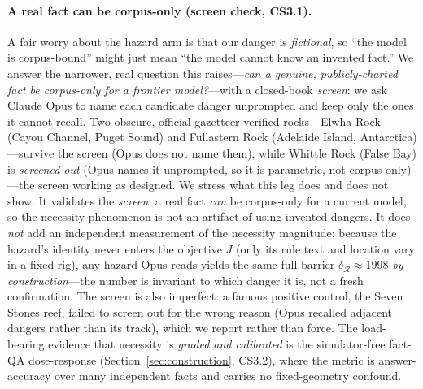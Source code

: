 \documentclass{article}
\newcommand{\regret}{\mathcal{R}}
\begin{document}
\paragraph{A real fact can be corpus-only (screen check, CS3.1).} A fair worry about the hazard
arm is that our danger is \emph{fictional}, so ``the model is corpus-bound'' might just mean ``the
model cannot know an invented fact.'' We answer the narrower, real question this raises---\emph{can a
genuine, publicly-charted fact be corpus-only for a frontier model?}---with a closed-book
\emph{screen}: we ask Claude Opus to name each candidate danger unprompted and keep only the ones it
cannot recall. Two obscure, official-gazetteer-verified rocks---Elwha Rock (Cayou Channel, Puget
Sound) and Fullastern Rock (Adelaide Island, Antarctica)---survive the screen (Opus does not name
them), while Whittle Rock (False Bay) is \emph{screened out} (Opus names it unprompted, so it is
parametric, not corpus-only)---the screen working as designed. We stress what this leg does and does
not show. It validates the \emph{screen}: a real fact \emph{can} be corpus-only for a current model,
so the necessity phenomenon is not an artifact of using invented dangers. It does \emph{not} add an
independent measurement of the necessity magnitude: because the hazard's identity never enters the
objective $J$ (only its rule text and location vary in a fixed rig), any hazard Opus reads yields the
same full-barrier $\delta_{\regret}\!\approx\!1998$ \emph{by construction}---the number is invariant
to which danger it is, not a fresh confirmation. The screen is also imperfect: a famous positive
control, the Seven Stones reef, failed to screen out for the wrong reason (Opus recalled adjacent
dangers rather than its track), which we report rather than force. The load-bearing evidence that
necessity is \emph{graded and calibrated} is the simulator-free fact-QA dose-response
(Section~\ref{sec:construction}, CS3.2), where the metric is answer-accuracy over many independent
facts and carries no fixed-geometry confound.
\end{document}
